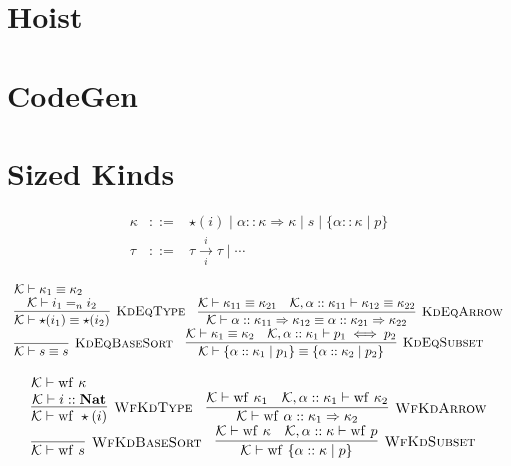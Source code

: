 \documentclass[fleqn]{article}
\begin{document}
\section{Hoist}

\section{CodeGen}

\section{Sized Kinds}

\[
\begin{array}{rcl}
	\kappa & ::= & \star(i) \mid \alpha :: \kappa \Rightarrow \kappa \mid s \mid \{ \alpha :: \kappa \mid p \} \\
	\tau & ::= & \tau \xrightarrow[i]{i} \tau \mid \cdots
\end{array}
\]

\[
\begin{array}{l}
	\mathcal{K} \vdash \kappa_1 \equiv \kappa_2 \\
	\infer[\textsc{KdEqType}]{\mathcal{K} \vdash \star(i_1) \equiv \star(i_2)}{\mathcal{K} \vdash i_1 =_n i_2} \hspace{1em}
	\infer[\textsc{KdEqArrow}]{\mathcal{K} \vdash \alpha :: \kappa_{11} \Rightarrow \kappa_{12} \equiv \alpha :: \kappa_{21} \Rightarrow \kappa_{22}}{\mathcal{K} \vdash \kappa_{11} \equiv \kappa_{21} & \mathcal{K}, \alpha :: \kappa_{11} \vdash \kappa_{12} \equiv \kappa_{22}} \\
	\infer[\textsc{KdEqBaseSort}]{\mathcal{K} \vdash s \equiv s}{} \hspace{1em}
	\infer[\textsc{KdEqSubset}]{\mathcal{K} \vdash \{ \alpha :: \kappa_1 \mid p_1 \} \equiv \{ \alpha :: \kappa_2 \mid p_2 \} }{\mathcal{K} \vdash \kappa_1 \equiv \kappa_2 & \mathcal{K},\alpha::\kappa_1 \vdash p_1 \iff p_2}
\end{array}
\]

\[
\begin{array}{l}
	\mathcal{K} \vdash \mathrm{wf}~\kappa \\
	\infer[\textsc{WfKdType}]{\mathcal{K} \vdash \mathrm{wf}~\star(i)}{\mathcal{K} \vdash i :: \mathbf{Nat}} \hspace{1em}
	\infer[\textsc{WfKdArrow}]{\mathcal{K} \vdash \mathrm{wf}~\alpha :: \kappa_1 \Rightarrow \kappa_2}{\mathcal{K} \vdash \mathrm{wf}~\kappa_1 & \mathcal{K},\alpha::\kappa_1 \vdash \mathrm{wf}~\kappa_2} \\
	\infer[\textsc{WfKdBaseSort}]{\mathcal{K} \vdash \mathrm{wf}~s}{} \hspace{1em}
	\infer[\textsc{WfKdSubset}]{\mathcal{K} \vdash \mathrm{wf}~\{  \alpha :: \kappa \mid p \}}{\mathcal{K} \vdash \mathrm{wf}~\kappa & \mathcal{K},\alpha::\kappa \vdash \mathrm{wf}~p}
\end{array}
\]
\end{document}
